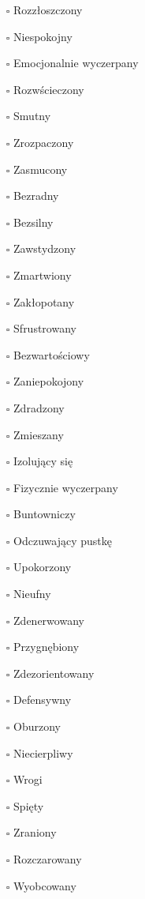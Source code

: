 \begin{multicols}{3}
\begin{itemize}
\item[$\square$]{Rozzłoszczony}
\item[$\square$]{Niespokojny}
\item[$\square$]{Emocjonalnie wyczerpany}
\item[$\square$]{Rozwścieczony}
\item[$\square$]{Smutny}
\item[$\square$]{Zrozpaczony}
\item[$\square$]{Zasmucony}
\item[$\square$]{Bezradny}
\item[$\square$]{Bezsilny}
\item[$\square$]{Zawstydzony}
\item[$\square$]{Zmartwiony}
\item[$\square$]{Zakłopotany}
\item[$\square$]{Sfrustrowany}
\item[$\square$]{Bezwartościowy}
\item[$\square$]{Zaniepokojony}
\item[$\square$]{Zdradzony}
\item[$\square$]{Zmieszany}
\item[$\square$]{Izolujący się}
\item[$\square$]{Fizycznie wyczerpany}
\item[$\square$]{Buntowniczy}
\item[$\square$]{Odczuwający pustkę}
\item[$\square$]{Upokorzony}
\item[$\square$]{Nieufny}
\item[$\square$]{Zdenerwowany}
\item[$\square$]{Przygnębiony}
\item[$\square$]{Zdezorientowany}
\item[$\square$]{Defensywny}
\item[$\square$]{Oburzony}
\item[$\square$]{Niecierpliwy}
\item[$\square$]{Wrogi}
\item[$\square$]{Spięty}
\item[$\square$]{Zraniony}
\item[$\square$]{Rozczarowany}
\item[$\square$]{Wyobcowany}
\end{itemize}
\end{multicols}


